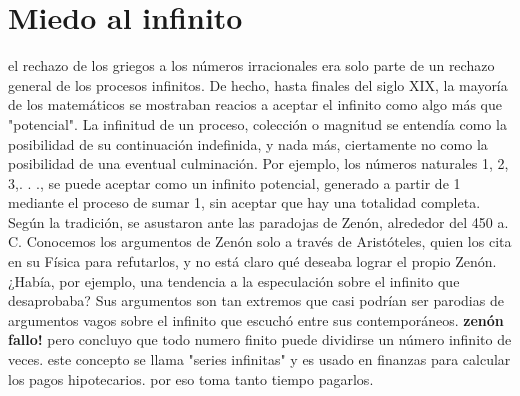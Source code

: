 \documentclass{book}
\begin{document}
    \section{Miedo al infinito}
    el rechazo de los griegos a los números irracionales era solo parte de un rechazo general de los procesos infinitos.
    De hecho, hasta finales del siglo XIX, la mayoría de los matemáticos se mostraban reacios a aceptar el infinito como algo más que "potencial".
    La infinitud de un proceso, colección o magnitud se entendía como la posibilidad de su continuación indefinida, y nada más, ciertamente no como la posibilidad de una eventual culminación. Por ejemplo, los números naturales 1, 2, 3,. . ., se puede aceptar como un infinito potencial, generado a partir de 1 mediante el proceso de sumar 1, sin aceptar que hay una totalidad completa.
    Según la tradición, se asustaron ante las paradojas de Zenón, alrededor del 450 a. C.
    Conocemos los argumentos de Zenón solo a través de Aristóteles, quien los cita
    en su Física para refutarlos, y no está claro qué deseaba lograr el propio Zenón. ¿Había, por ejemplo, una tendencia a la especulación sobre el infinito que desaprobaba? Sus argumentos son tan extremos que casi podrían ser parodias de argumentos vagos sobre el infinito que escuchó entre
    sus contemporáneos.
    \textbf{zenón fallo!} pero concluyo que todo numero finito puede dividirse un número infinito de veces.
    este concepto se llama "series infinitas" y es usado en finanzas para calcular los pagos hipotecarios. por eso toma tanto tiempo pagarlos.
    
\end{document}
